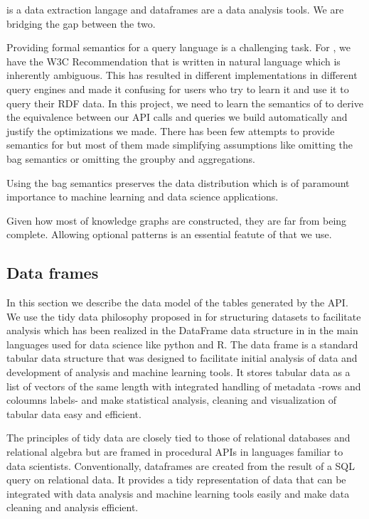 

\sparql is a data extraction langage and dataframes are a data analysis tools. We are bridging the gap between the two. 

Providing formal semantics for a query language is a challenging task. For \sparql, we have the W3C Recommendation that is written in natural language which is inherently ambiguous. This has resulted in different implementations in different query engines and made it confusing for users who try to learn it and use it to query their RDF data. In this project, we need to learn the semantics of \sparql to derive the equivalence between our API calls and \sparql queries we build automatically and justify the optimizations we made. There has been few attempts to provide semantics for \sparql but most of them made simplifying assumptions like omitting the bag semantics %
or omitting the groupby and aggregations. %

Using the bag semantics preserves the data distribution which is of paramount importance to machine learning and data science applications.\cite{sqlsemantics}

Given how most of knowledge graphs are constructed, they are far from being complete. Allowing optional patterns is an essential featute of \sparql that we use. 

\subsection{Data frames}

In this section we describe the data model of the tables generated by the API. We use the tidy data philosophy  proposed in \cite{tidydata} for structuring datasets to facilitate analysis which has been realized in the DataFrame data structure in in the main languages used for data science like python and R.
The data frame is a standard tabular data structure that was designed to facilitate initial analysis of data and development of analysis and machine learning tools. It stores tabular data as a list of vectors of the same length with integrated handling of metadata \cite{pandas} -rows and coloumns labels- and make statistical analysis, cleaning and visualization of tabular data easy and efficient. 

The principles of tidy data are closely tied to those of relational databases and relational algebra \cite{relalgebra} but are framed in procedural APIs in languages familiar to data scientists. Conventionally, dataframes are created from the result of a SQL query on relational data. It provides a tidy representation of data that can be integrated with data analysis and machine learning tools easily and make data cleaning and analysis efficient.


